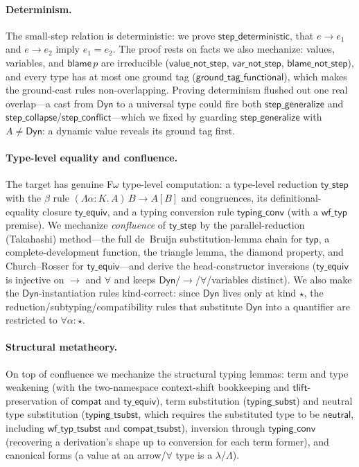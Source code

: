\documentclass[acmsmall,anonymous=false,nonacm]{acmart}
\newcommand{\dyn}{\ensuremath{\mathsf{Dyn}}}
\newcommand{\kstar}{\ensuremath{\star}}
\newcommand{\blame}[1]{\mathsf{blame}\,#1}
\newcommand{\reduces}{\longrightarrow}
\begin{document}
\paragraph{Determinism.}
The small-step relation is deterministic: we prove
$\mathsf{step\_deterministic}$, that $e \reduces e_1$ and $e \reduces e_2$
imply $e_1 = e_2$. The proof rests on facts we also mechanize: values,
variables, and $\blame p$ are irreducible ($\mathsf{value\_not\_step}$,
$\mathsf{var\_not\_step}$, $\mathsf{blame\_not\_step}$), and every type has at
most one ground tag ($\mathsf{ground\_tag\_functional}$), which makes the
ground-cast rules non-overlapping. Proving determinism flushed out one real
overlap---a cast from $\dyn$ to a universal type could fire both
$\mathsf{step\_generalize}$ and
$\mathsf{step\_collapse}$/$\mathsf{step\_conflict}$---which we fixed by
guarding $\mathsf{step\_generalize}$ with $A \neq \dyn$: a dynamic value
reveals its ground tag first.

\paragraph{Type-level equality and confluence.}
The target has genuine F$\omega$ type-level computation: a type-level
reduction $\mathsf{ty\_step}$ with the $\beta$ rule
$(\Lambda\alpha{:}K.\,A)\,B \reduces A[B]$ and congruences, its
definitional-equality closure $\mathsf{ty\_equiv}$, and a typing conversion
rule $\mathsf{typing\_conv}$ (with a $\mathsf{wf\_typ}$ premise). We mechanize
\emph{confluence} of $\mathsf{ty\_step}$ by the parallel-reduction (Takahashi)
method---the full de~Bruijn substitution-lemma chain for $\mathsf{typ}$, a
complete-development function, the triangle lemma, the diamond property, and
Church--Rosser for $\mathsf{ty\_equiv}$---and derive the head-constructor
inversions ($\mathsf{ty\_equiv}$ is injective on $\to$ and $\forall$ and keeps
$\dyn$/$\to$/$\forall$/variables distinct). We also make the
$\dyn$-instantiation rules kind-correct: since $\dyn$ lives only at kind
$\kstar$, the reduction/subtyping/compatibility rules that substitute $\dyn$
into a quantifier are restricted to $\forall\alpha{:}\kstar$.

\paragraph{Structural metatheory.}
On top of confluence we mechanize the structural typing lemmas: term and type
weakening (with the two-namespace context-shift bookkeeping and
$\mathsf{tlift}$-preservation of $\mathsf{compat}$ and $\mathsf{ty\_equiv}$),
term substitution ($\mathsf{typing\_subst}$) and neutral type substitution
($\mathsf{typing\_tsubst}$, which requires the substituted type to be
$\mathsf{neutral}$, including $\mathsf{wf\_typ\_tsubst}$ and
$\mathsf{compat\_tsubst}$), inversion through $\mathsf{typing\_conv}$
(recovering a derivation's shape up to conversion for each term former), and
canonical forms (a value at an arrow/$\forall$ type is a
$\lambda$/$\Lambda$).
\end{document}
